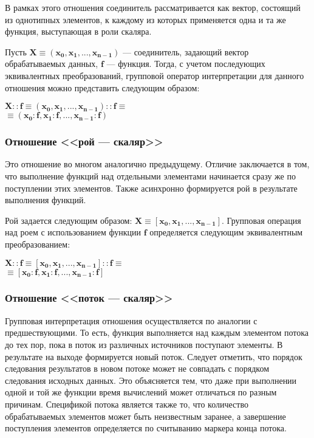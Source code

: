В рамках этого отношения соединитель рассматривается как вектор, состоящий из однотипных элементов, к каждому из которых применяется одна и та же функция, выступающая в роли скаляра.

Пусть $\mathbf{X \equiv (x_0, x_1, ..., x_{n-1})}$ --- соединитель, задающий вектор обрабатываемых данных, $\mathbf{f}$ --- функция. Тогда, с учетом последующих эквивалентных преобразований, групповой оператор интерпретации для данного отношения можно представить следующим образом:
\begin{center}
	$\mathbf{X::f \equiv (x_0, x_1, ..., x_{n-1})::f \equiv}$\\
	$\mathbf{\equiv (x_0:f, x_1:f, ..., x_{n-1}:f)}$
\end{center}

\subsubsection{Отношение <<рой --- скаляр>>}

Это отношение во многом аналогично предыдущему. Отличие заключается в том, что выполнение функций над отдельными элементами начинается сразу же по поступлении этих элементов. Также асинхронно формируется рой в результате выполнения функций.

Рой задается следующим образом: $\mathbf{X \equiv [x_0, x_1, ..., x_{n-1}]}$. Групповая операция над роем с использованием функции  $\mathbf{f}$ определяется следующим эквивалентным преобразованием:
\begin{center}
	$\mathbf{X::f \equiv [x_0, x_1, ..., x_{n-1}]::f \equiv}$\\
	$\mathbf{\equiv [x_0:f, x_1:f, ..., x_{n-1}:f]}$
\end{center}

\subsubsection{Отношение <<поток --- скаляр>>}

Групповая интерпретация отношения осуществляется по аналогии с предшествующими. То есть, функция выполняется над каждым элементом потока до тех пор, пока в поток из различных источников поступают элементы. В результате на выходе формируется новый поток. Следует отметить, что порядок следования результатов в новом потоке может не совпадать с порядком следования исходных данных. Это объясняется тем, что даже при выполнении одной и той же функции время вычислений может отличаться по разным причинам. Спецификой потока является также то, что количество обрабатываемых элементов может быть неизвестным заранее, а завершение поступления элементов определяется по считыванию маркера конца потока.

